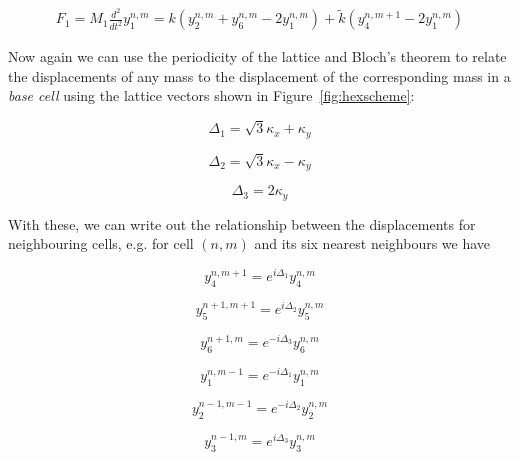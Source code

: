 \begin{align}
  F_1=M_1\frac{d^{2}}{dt^{2}}y_1^{n,m}
      =k\left(y_2^{n,m}+y_6^{n,m}-2y_1^{n,m}\right)+
       \tilde{k}\left(y_4^{n,m+1}-2y_1^{n,m}\right)
\label{eq:2dH1}
\end{align}

Now again we can use the periodicity of the lattice and Bloch's theorem to
relate the displacements of any mass to the displacement of the corresponding
mass in a \textit{base cell} using the lattice vectors shown in
Figure~\ref{fig:hexscheme}:

\begin{equation}
  \Delta_1=\sqrt{3}\kappa_x+\kappa_y
\label{eq:hexvec1}
\end{equation}

\begin{equation}
  \Delta_2=\sqrt{3}\kappa_x-\kappa_y
\label{eq:hexvec2}
\end{equation}

\begin{equation}
  \Delta_3=2\kappa_y
\label{eq:hexvec3}
\end{equation}

With these, we can write out the relationship between the displacements for
neighbouring cells, e.g. for cell $(n,m)$ and its six nearest neighbours we
have

\begin{equation}
  y_4^{n,m+1}=e^{i\Delta_1}y_4^{n,m}
\label{eq:hexrelate4}
\end{equation}

\begin{equation}
  y_5^{n+1,m+1}=e^{i\Delta_2}y_5^{n,m}
\label{eq:hexrelate5}
\end{equation}

\begin{equation}
  y_6^{n+1,m}=e^{-i\Delta_3}y_6^{n,m}
\label{eq:hexrelate6}
\end{equation}

\begin{equation}
  y_1^{n,m-1}=e^{-i\Delta_1}y_1^{n,m}
\label{eq:hexrelate1}
\end{equation}

\begin{equation}
  y_2^{n-1,m-1}=e^{-i\Delta_2}y_2^{n,m}
\label{eq:hexrelate2}
\end{equation}

\begin{equation}
  y_3^{n-1,m}=e^{i\Delta_3}y_3^{n,m}
\label{eq:hexrelate3}
\end{equation}

